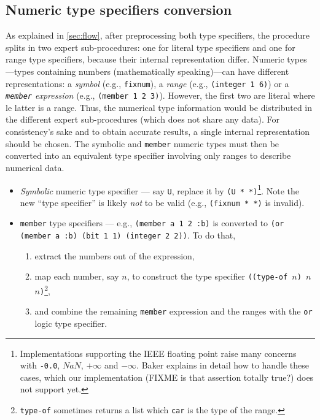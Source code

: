 \documentclass[format=sigconf]{acmart}
\newcommand\code[2][\small]{\sloppy\texttt{#1#2}}
\newcommand\footcode[1]{\code[\scriptsize]{#1}}
\theoremstyle{definition}
\begin{document}
\subsection{Numeric type specifiers conversion}
\label{sec:numconv}
As explained in \vref{sec:flow}, after preprocessing both type specifiers, the
procedure splits in two expert sub-procedures: one for literal type specifiers
and one for range type specifiers, because their internal representation differ.
Numeric types---types containing numbers (mathematically speaking)---can have
different representations: a \emph{symbol} (e.g., \code{fixnum}), a \emph{range}
(e.g., \code{(integer 1 6)}) or a \emph{\code{member} expression}
(e.g., \code{(member 1 2 3)}). However, the first two are literal where le
latter is a range. Thus, the numerical type information would be distributed in
the different expert sub-procedures (which does not share any data). For
consistency's sake and to obtain accurate results, a single internal
representation should be chosen. The symbolic and \code{member} numeric types
must then be converted into an equivalent type specifier involving only ranges
to describe numerical data.

\begin{itemize}
\item \emph{Symbolic} numeric type specifier --- say \code{U}, replace it by
  \code{(U * *)}\footnote{Implementations supporting the IEEE floating point
    raise many concerns with \footcode{-0.0}, $NaN$, $+\infty$ and $-\infty$.
    Baker explains in detail how to handle these cases, which our implementation
    (FIXME is that assertion totally true?)
    does not support yet.}. Note the new ``type specifier'' is likely
  \emph{not} to be valid (e.g., \code{(fixnum * *)} is invalid).
\item \code{member} type specifiers --- e.g., \code{(member a 1 2 :b)} is
  converted to \code{(or (member a :b) (bit 1 1) (integer 2 2))}.
  To do that,
  \begin{enumerate}
  \item extract the numbers out of the expression,
  \item map each number, say $n$, to construct the type specifier
    \code{((type-of $n$) $n$ $n$)}\footnote{\footcode{type-of} sometimes
      returns a list which \footcode{car} is the type of the range.},
  \item and combine the remaining \code{member} expression and the ranges with
    the \code{or} logic type specifier.
  \end{enumerate}
\end{itemize}
\end{document}
